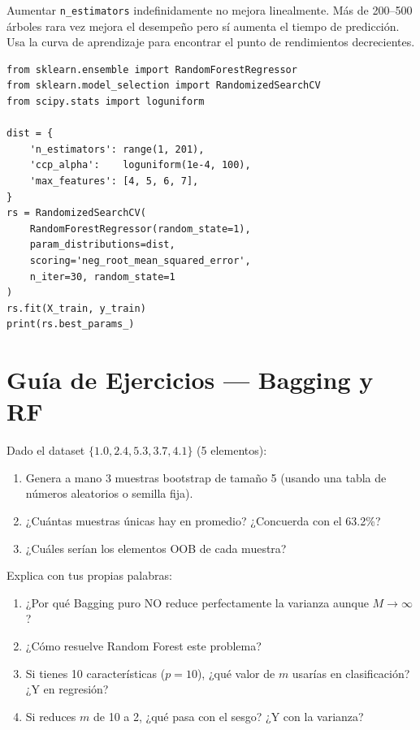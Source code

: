 \documentclass[11pt, a4paper]{book}
\begin{document}
\begin{alerta}
  Aumentar \texttt{n\_estimators} indefinidamente no mejora linealmente. Más de 200--500 árboles
  rara vez mejora el desempeño pero sí aumenta el tiempo de predicción.
  Usa la curva de aprendizaje para encontrar el punto de rendimientos decrecientes.
\end{alerta}

\begin{lstlisting}[caption={Random Forest con RandomizedSearchCV}]
from sklearn.ensemble import RandomForestRegressor
from sklearn.model_selection import RandomizedSearchCV
from scipy.stats import loguniform

dist = {
    'n_estimators': range(1, 201),
    'ccp_alpha':    loguniform(1e-4, 100),
    'max_features': [4, 5, 6, 7],
}
rs = RandomizedSearchCV(
    RandomForestRegressor(random_state=1),
    param_distributions=dist,
    scoring='neg_root_mean_squared_error',
    n_iter=30, random_state=1
)
rs.fit(X_train, y_train)
print(rs.best_params_)
\end{lstlisting}

\section{Guía de Ejercicios — Bagging y RF}

\begin{ejercicio}
  Dado el dataset $\{1.0, 2.4, 5.3, 3.7, 4.1\}$ (5 elementos):
  \begin{enumerate}
    \item Genera a mano 3 muestras bootstrap de tamaño 5 (usando una tabla de números aleatorios
          o semilla fija).
    \item ¿Cuántas muestras únicas hay en promedio? ¿Concuerda con el 63.2\%?
    \item ¿Cuáles serían los elementos OOB de cada muestra?
  \end{enumerate}
\end{ejercicio}

\begin{ejercicio}
  Explica con tus propias palabras:
  \begin{enumerate}
    \item ¿Por qué Bagging puro NO reduce perfectamente la varianza aunque $M \to \infty$?
    \item ¿Cómo resuelve Random Forest este problema?
    \item Si tienes 10 características ($p=10$), ¿qué valor de $m$ usarías en clasificación?
          ¿Y en regresión?
    \item Si reduces $m$ de 10 a 2, ¿qué pasa con el sesgo? ¿Y con la varianza?
  \end{enumerate}
\end{ejercicio}
\end{document}
